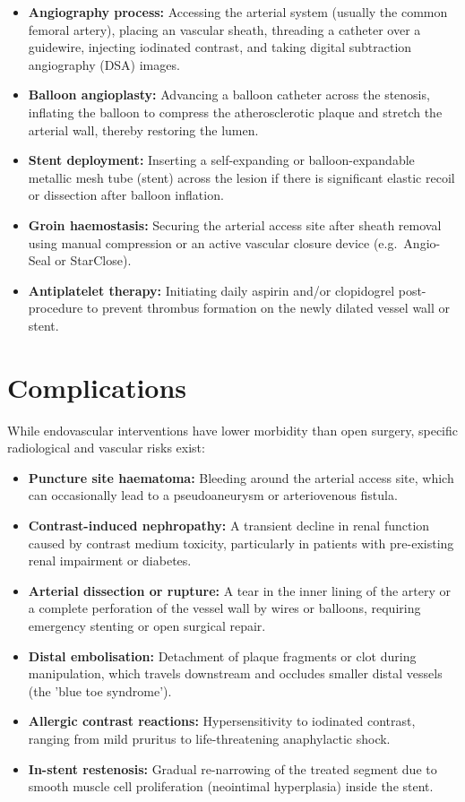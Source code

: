 \begin{itemize}
    \item \textbf{Angiography process:} Accessing the arterial system (usually the common femoral artery), placing an vascular sheath, threading a catheter over a guidewire, injecting iodinated contrast, and taking digital subtraction angiography (DSA) images.
    \item \textbf{Balloon angioplasty:} Advancing a balloon catheter across the stenosis, inflating the balloon to compress the atherosclerotic plaque and stretch the arterial wall, thereby restoring the lumen.
    \item \textbf{Stent deployment:} Inserting a self-expanding or balloon-expandable metallic mesh tube (stent) across the lesion if there is significant elastic recoil or dissection after balloon inflation.
    \item \textbf{Groin haemostasis:} Securing the arterial access site after sheath removal using manual compression or an active vascular closure device (e.g.\ Angio-Seal or StarClose).
    \item \textbf{Antiplatelet therapy:} Initiating daily aspirin and/or clopidogrel post-procedure to prevent thrombus formation on the newly dilated vessel wall or stent.
\end{itemize}

\section*{Complications}
While endovascular interventions have lower morbidity than open surgery, specific radiological and vascular risks exist:

\begin{itemize}
    \item \textbf{Puncture site haematoma:} Bleeding around the arterial access site, which can occasionally lead to a pseudoaneurysm or arteriovenous fistula.
    \item \textbf{Contrast-induced nephropathy:} A transient decline in renal function caused by contrast medium toxicity, particularly in patients with pre-existing renal impairment or diabetes.
    \item \textbf{Arterial dissection or rupture:} A tear in the inner lining of the artery or a complete perforation of the vessel wall by wires or balloons, requiring emergency stenting or open surgical repair.
    \item \textbf{Distal embolisation:} Detachment of plaque fragments or clot during manipulation, which travels downstream and occludes smaller distal vessels (the 'blue toe syndrome').
    \item \textbf{Allergic contrast reactions:} Hypersensitivity to iodinated contrast, ranging from mild pruritus to life-threatening anaphylactic shock.
    \item \textbf{In-stent restenosis:} Gradual re-narrowing of the treated segment due to smooth muscle cell proliferation (neointimal hyperplasia) inside the stent.
\end{itemize}

